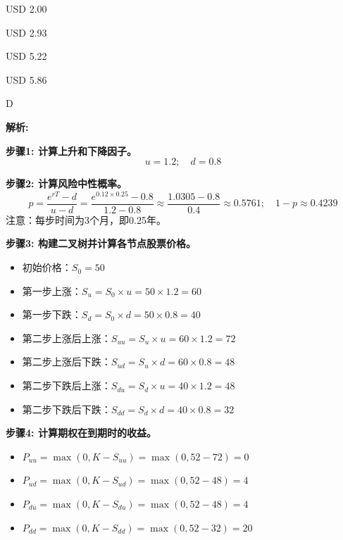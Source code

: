 \documentclass{article}
\newenvironment{explanation}
{\textbf{解析:}\par}
{\par}
\begin{document}
    \begin{choices}
    \item USD 2.00
    \item USD 2.93
    \item USD 5.22
    \item USD 5.86
    \end{choices}
    
    \begin{correctanswer}
    D
    \end{correctanswer}

   \begin{explanation}
    \textbf{步骤1: 计算上升和下降因子。}
    \[
    u = 1.2; \quad d = 0.8
    \]

    \textbf{步骤2: 计算风险中性概率。}
    \[
    p = \frac{e^{rT} - d}{u - d} = \frac{e^{0.12 \times 0.25} - 0.8}{1.2 - 0.8} \approx \frac{1.0305 - 0.8}{0.4} \approx 0.5761; \quad 1 - p \approx 0.4239
    \]
    注意：每步时间为3个月，即0.25年。

    \textbf{步骤3: 构建二叉树并计算各节点股票价格。}
    \begin{itemize}
        \item 初始价格：$S_0 = 50$
        \item 第一步上涨：$S_u = S_0 \times u = 50 \times 1.2 = 60$
        \item 第一步下跌：$S_d = S_0 \times d = 50 \times 0.8 = 40$
        \item 第二步上涨后上涨：$S_{uu} = S_u \times u = 60 \times 1.2 = 72$
        \item 第二步上涨后下跌：$S_{ud} = S_u \times d = 60 \times 0.8 = 48$
        \item 第二步下跌后上涨：$S_{du} = S_d \times u = 40 \times 1.2 = 48$
        \item 第二步下跌后下跌：$S_{dd} = S_d \times d = 40 \times 0.8 = 32$
    \end{itemize}

    \textbf{步骤4: 计算期权在到期时的收益。}
    \begin{itemize}
        \item $P_{uu} = \max(0, K - S_{uu}) = \max(0, 52 - 72) = 0$
        \item $P_{ud} = \max(0, K - S_{ud}) = \max(0, 52 - 48) = 4$
        \item $P_{du} = \max(0, K - S_{du}) = \max(0, 52 - 48) = 4$
        \item $P_{dd} = \max(0, K - S_{dd}) = \max(0, 52 - 32) = 20$
    \end{itemize}


\end{explanation}
\end{document}
